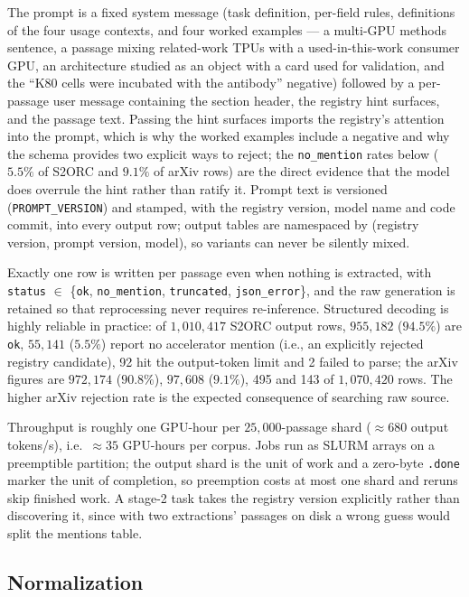 The prompt is a fixed system message (task definition, per-field rules,
definitions of the four usage contexts, and four worked examples --- a
multi-GPU methods sentence, a passage mixing related-work TPUs with a
used-in-this-work consumer GPU, an architecture studied as an object with a card
used for validation, and the ``K80 cells were incubated with the antibody''
negative) followed by a per-passage user message containing the section header,
the registry hint surfaces, and the passage text. Passing the hint surfaces
imports the registry's attention into the prompt, which is why the worked
examples include a negative and why the schema provides two explicit ways to
reject; the \texttt{no\_mention} rates below ($5.5\%$ of S2ORC and $9.1\%$ of
arXiv rows) are the direct evidence that the model does overrule the hint rather
than ratify it. Prompt text is versioned
(\texttt{PROMPT\_VERSION}) and stamped, with the registry version, model name
and code commit, into every output row; output tables are namespaced by
(registry version, prompt version, model), so variants can never be silently
mixed.

Exactly one row is written per passage even when nothing is extracted, with
\texttt{status} $\in$ \{\texttt{ok}, \texttt{no\_mention}, \texttt{truncated},
\texttt{json\_error}\}, and the raw generation is retained so that reprocessing
never requires re-inference. Structured decoding is highly reliable in practice:
of $1{,}010{,}417$ S2ORC output rows, $955{,}182$ ($94.5\%$) are \texttt{ok},
$55{,}141$ ($5.5\%$) report no accelerator mention (i.e., an explicitly rejected
registry candidate), 92 hit the output-token limit and 2 failed to parse; the
arXiv figures are $972{,}174$ ($90.8\%$), $97{,}608$ ($9.1\%$), 495 and 143 of
$1{,}070{,}420$ rows. The higher arXiv rejection rate is the expected
consequence of searching raw source.

Throughput is roughly one GPU-hour per $25{,}000$-passage shard
($\approx 680$ output tokens/s), i.e.\ $\approx 35$ GPU-hours per corpus. Jobs
run as SLURM arrays on a preemptible partition; the output shard is the unit of
work and a zero-byte \texttt{.done} marker the unit of completion, so preemption
costs at most one shard and reruns skip finished work. A stage-2 task takes the
registry version explicitly rather than discovering it, since with two extractions'
passages on disk a wrong guess would split the mentions table.

\subsection{Normalization}

